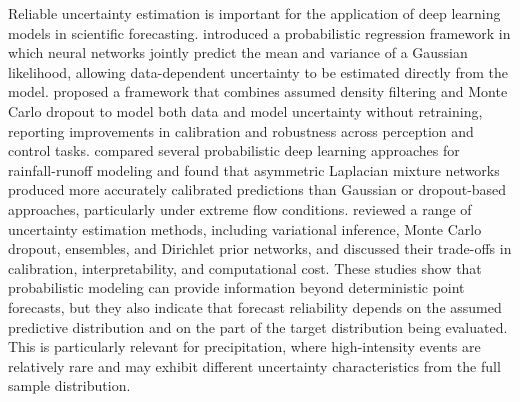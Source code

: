 Reliable uncertainty estimation is important for the application of deep learning models in scientific forecasting. \citet{kendall2017uncertainties} introduced a probabilistic regression framework in which neural networks jointly predict the mean and variance of a Gaussian likelihood, allowing data-dependent uncertainty to be estimated directly from the model. \citet{9001195} proposed a framework that combines assumed density filtering and Monte Carlo dropout to model both data and model uncertainty without retraining, reporting improvements in calibration and robustness across perception and control tasks. \citet{klotz2022uncertainty} compared several probabilistic deep learning approaches for rainfall-runoff modeling and found that asymmetric Laplacian mixture networks produced more accurately calibrated predictions than Gaussian or dropout-based approaches, particularly under extreme flow conditions. \citet{mena2021survey} reviewed a range of uncertainty estimation methods, including variational inference, Monte Carlo dropout, ensembles, and Dirichlet prior networks, and discussed their trade-offs in calibration, interpretability, and computational cost. These studies show that probabilistic modeling can provide information beyond deterministic point forecasts, but they also indicate that forecast reliability depends on the assumed predictive distribution and on the part of the target distribution being evaluated. This is particularly relevant for precipitation, where high-intensity events are relatively rare and may exhibit different uncertainty characteristics from the full sample distribution.

